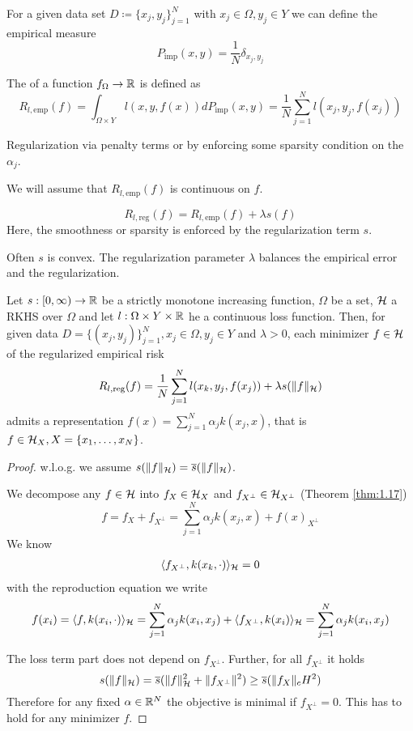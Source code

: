 For a given data set $D\coloneqq\{x_j,y_j\}_{j=1}^N$ with $x_j\in \Omega,y_j\in Y$ we can define 
the empirical measure 
\[P_{\text{imp}}(x,y)=\frac{1}{N}\delta_{x_j,y_j}\]

\begin{definition}\label{def:45}
    The  of a function $f_\Omega\to\mathbb{R}$ is defined as 
    \[R_{l,\text{emp}}(f)=\int_{\Omega\times Y} l(x,y,f(x))d P_{\text{imp}}(x,y)=\frac{1}{N}\sum_{j=1}^N l(x_j,y_j,f(x_j))\]
\end{definition}

\begin{aremark}
    Regularization via penalty terms or by enforcing some sparsity condition on the $\alpha_j$.
\end{aremark}

We will assume that $R_{l,\text{emp}}(f)$ is continuous on $f$. 

\[R_{l,\text{reg}}(f)=R_{l,\text{emp}}(f)+\lambda s(f)\]
Here, the smoothness or sparsity is enforced by the regularization term $s$.

Often $s$ is convex. The regularization parameter $\lambda$ balances 
the empirical error and the regularization.

\begin{theorem}\label{thm:46}
    Let $s:[0,\infty)\to\mathbb{R}$ be a strictly monotone increasing function, $\Omega$ 
    be a set, $\mathcal{H}$ a RKHS over $\Omega$ and let $l:\Omega\times Y \times \mathbb{R}$ he a continuous loss 
    function. Then, for given data $D=\{(x_j,y_j)\}_{j=1}^N,x_j\in\Omega,y_j\in Y$ and 
    $\lambda>0$, each minimizer $f\in\mathcal{H}$ of the regularized empirical risk 
    \[R_{l,\text{reg}}(f)=\frac{1}{N}\sum_{j=1}^N l(x_k,y_j,f(x_j))+\lambda s(\Vert f\Vert_{\mathcal{H}})\]
    admits a representation $f(x)=\sum_{j=1}^N \alpha_j k(x_j,x)$,
    that is $f\in \mathcal{H}_X,X=\{x_1,\dots,x_N\}$.
\end{theorem}

\begin{proof}
    w.l.o.g. we assume $s(\Vert f\Vert_{\mathcal{H}})=\overline{s}(\Vert f \Vert_{\mathcal{H}})$.

    We decompose any $f\in\mathcal{H}$ into $f_X\in\mathcal{H}_X$ and $f_{X^\perp}\in \mathcal{H}_{X^\perp}$ (Theorem \ref{thm:1.17})
    \[f=f_X+f_{X^\perp}=\sum_{j=1}^N \alpha_j k(x_j,x)+f(x)_{X^\perp}\]
    We know 
    \begin{align*}
        \langle f_{X^\perp},k(x_k,\cdot)\rangle_{\mathcal{H}}=0
    \end{align*}
    with the reproduction equation we write 
    \[f(x_i)=\langle f,k(x_i,\cdot)\rangle_{\mathcal{H}} = \sum_{j=1}^N \alpha_j k(x_i,x_j)+\langle f_{X^\perp},k(x_i)\rangle_{\mathcal{H}}=\sum_{j=1}^N \alpha_j k(x_i,x_j)\]

    The loss term part does not depend on $f_{X^\perp}$. Further, for all $f_{X^\perp}$ it holds 
    \[s(\Vert f\Vert_{\mathcal{H}})=\overline{s}(\Vert f\Vert_{\mathcal{H}}^2+\Vert f_{X^\perp}\Vert^2)\geq \overline{s}(\Vert f_X\Vert_cH^2)\]
    Therefore for any fixed $\alpha\in\mathbb{R}^N$ the objective is minimal if $f_{X^\perp}=0$. This has to hold 
    for any minimizer $f$.

\end{proof}

